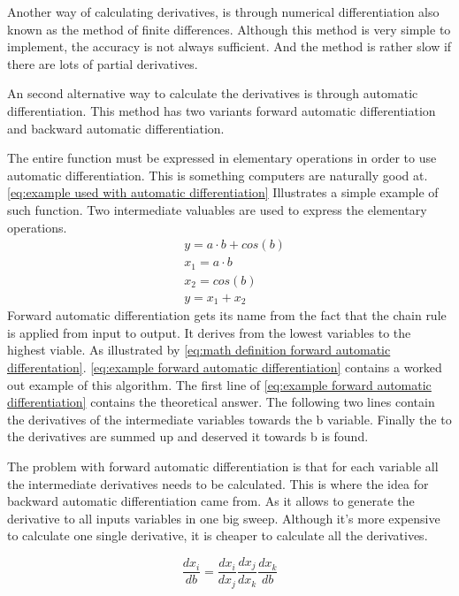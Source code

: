 Another way of calculating derivatives, is through numerical differentiation also known as the method of finite differences. Although this method is very simple to implement, the accuracy is not always sufficient. And the method is rather slow if there are lots of partial derivatives.

An second alternative way to calculate the derivatives is through automatic differentiation. This method has two variants forward automatic differentiation and backward automatic differentiation.

The entire function must be expressed in elementary operations in order to use automatic differentiation. This is something computers are naturally good at. \eqref{eq:example used with automatic differentiation} Illustrates a simple example of such function. Two intermediate valuables are used to express the elementary operations.
\begin{equation}
	\begin{aligned}
		& y = a \cdot b + cos(b) \\
		& x_1 = a \cdot b \\
		& x_2 = cos(b) \\
		& y = x_1 + x_2		
	\end{aligned}
	\label{eq:example used with automatic differentiation}
\end{equation}
Forward automatic differentiation gets its name from the fact that the chain rule is applied from input to output. It derives from the lowest variables to the highest viable. As illustrated by \eqref{eq:math definition forward automatic differentation}. \eqref{eq:example forward automatic differentiation} contains a worked out example of this algorithm. The first line of \eqref{eq:example forward automatic differentiation} contains the theoretical answer. The  following two lines contain the derivatives of the intermediate variables towards the b variable. Finally the to the derivatives are summed up and deserved it towards b is found.

The problem with forward automatic differentiation is that for each variable all the intermediate derivatives needs to be calculated. This is where the idea for backward automatic differentiation came from. As it allows to generate the derivative to all inputs variables in one big sweep. Although it's more expensive to calculate one single derivative, it is cheaper to calculate all the derivatives.

\begin{equation}
	\frac{dx_i}{db} = \frac{dx_i}{dx_j}\frac{dx_j}{dx_k}\frac{dx_k}{db}
	\label{eq:math definition forward automatic differentation}
\end{equation}

